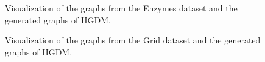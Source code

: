 \documentclass[letterpaper]{article} %
\begin{document}
\begin{figure}[htbp]
\centering
{} 
    \hspace{0.3in}
    \caption{Visualization of the graphs from the Enzymes dataset and the generated graphs of HGDM.}
    \label{fig:vis_en}
\end{figure}
\begin{figure}[htbp]
\centering
{} 
    \hspace{0.3in}
    \caption{Visualization of the graphs from the Grid dataset and the generated graphs of HGDM.}
    \label{fig:vis_grid}
\end{figure}

\bigskip
\end{document}
